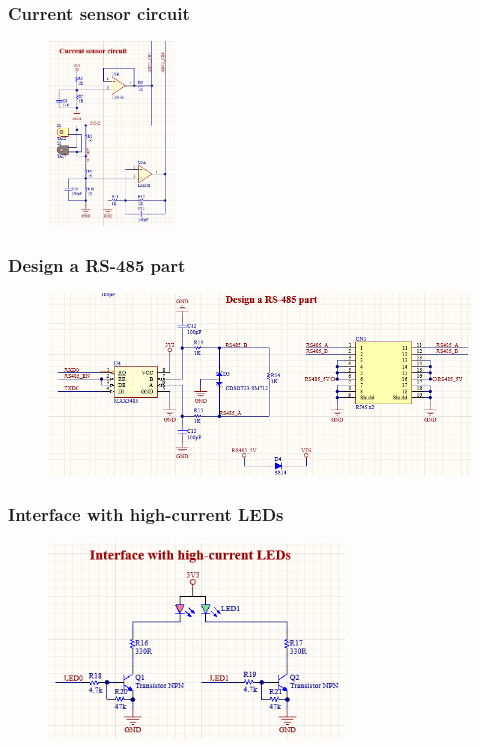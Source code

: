 \subsubsection{Current sensor circuit}
\label{subsec:Current sensor circuit}
\begin{figure}[!htbp]
    \centering
    \includegraphics[width=0.3\textwidth]{graphics/section3/f4.PNG}
\end{figure}
\FloatBarrier

\subsubsection{Design a RS-485 part}
\begin{figure}[!htbp]
    \centering
    \includegraphics[width=\textwidth]{graphics/section3/f5.PNG}
\end{figure}
\FloatBarrier

\subsubsection{Interface with high-current LEDs}
\begin{figure}[!htbp]
    \centering
    \includegraphics[width=0.7\textwidth]{graphics/section3/f6.PNG}
\end{figure}
\FloatBarrier

